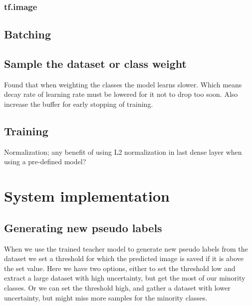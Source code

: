 \documentclass[thesis.tex]{subfiles}
\begin{document}


\subsubsection{tf.image}



\subsection{Batching}



\subsection{Sample the dataset or class weight}
Found that when weighting the classes the model learns slower. Which means decay rate of learning rate must be lowered for it not to drop too soon. Also increase the buffer for early stopping of training.




\subsection{Training}

Normalization; any benefit of using L2 normalization in last dense layer when using a pre-defined model?

\section{System implementation} \label{sec:system_implementation}


\subsection{Generating new pseudo labels}
When we use the trained teacher model to generate new pseudo labels from the dataset we set a threshold for which the predicted image is saved if it is above the set value. Here we have two options, either to set the threshold low and extract a large dataset with high uncertainty, but get the most of our minority classes. Or we can set the threshold high, and gather a dataset with lower uncertainty, but might miss more samples for the minority classes.
\end{document}
